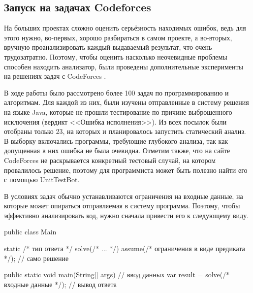 
\subsection{Запуск на задачах Codeforces}

На больших проектах сложно оценить серьёзность находимых ошибок, ведь для этого нужно, во-первых, хорошо разбираться в самом проекте, а во-вторых, вручную проанализировать каждый выдаваемый результат, что очень трудозатратно. Поэтому, чтобы оценить насколько неочевидные проблемы способен находить анализатор, были проведены дополнительные эксперименты на решениях задач с CodeForces \cite{codeforces}. 

В ходе работы было рассмотрено более 100 задач по программированию и алгоритмам. Для каждой из них, были изучены отправленные в систему решения на языке Java, которые не прошли тестирование по причине выброшенного исключения (вердикт <<Ошибка исполнения>>). Из всех посылок были отобраны только 23, на которых и планировалось запустить статический анализ. В выборку включались программы, требующие глубокого анализа, так как допущенная в них ошибка не была очевидна. Отметим также, что на сайте CodeForces не раскрывается конкретный тестовый случай, на котором провалилось решение, поэтому для программиста может быть полезно найти его с помощью UnitTestBot.

В условиях задач обычно устанавливаются ограничения на входные данные, на которые может опираться отправляемая в систему программа. Поэтому, чтобы эффективно анализировать код, нужно сначала привести его к следующему виду.

\begin{code}
public class Main {

    static /* тип ответа */ solve(/* ... */) {
        assume(/* ограничения в виде предиката */);
        // само решение
    }

    public static void main(String[] args) {
        // ввод данных
        var result = solve(/* входные данные */);
        // вывод ответа
    }
}
\end{code}

